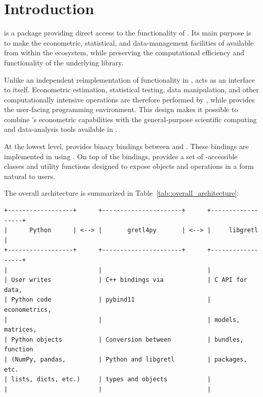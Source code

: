 \chapter*{Introduction}
\label{sec:introduction}

\gretlpy is a \python package providing direct access to the
functionality of \lgretl \citep{gretl_manual}. Its main purpose is to
make the econometric, statistical, and data-management facilities of
\gretl available from within the \python ecosystem, while preserving
the computational efficiency and functionality of the underlying
\lgretl library.

Unlike an independent reimplementation of \gretl functionality in
\python, \gretlpy acts as an interface to \lgretl itself. Econometric
estimation, statistical testing, data manipulation, and other
computationally intensive operations are therefore performed by
\lgretl, while \python provides the user-facing programming
environment. This design makes it possible to combine \gretl's
econometric capabilities with the general-purpose scientific computing
and data-analysis tools available in \python.

At the lowest level, \gretlpy provides binary bindings between
\python and \lgretl. These bindings are implemented in \cpp using
 \citep[see][for details]{pybind11}. On top of the
bindings, \gretlpy provides a set of \python-accessible classes and
utility functions designed to expose \lgretl objects and operations in
a form natural to \python users.

The overall architecture is summarized in
Table~\ref{tab::overall_architecture}:
\begin{table}[!h]
	\caption{Overall \gretlpy architecture.}%
	\label{tab::overall_architecture}
	\begin{center}\small
	\begin{BVerbatim}
+------------------+      +----------------------+      +------------------+
|      Python      | <--> |       gretl4py       | <--> |     libgretl     |
+------------------+      +----------------------+      +------------------+
|                         |                             |
| User writes             | C++ bindings via            | C API for data,
| Python code             | pybind11                    | econometrics,
|                         |                             | models, matrices,
| Python objects          | Conversion between          | bundles, function
| (NumPy, pandas,         | Python and libgretl         | packages, etc.
| lists, dicts, etc.)     | types and objects           |
|                         |                             |
	\end{BVerbatim}
	\end{center}
\end{table}

